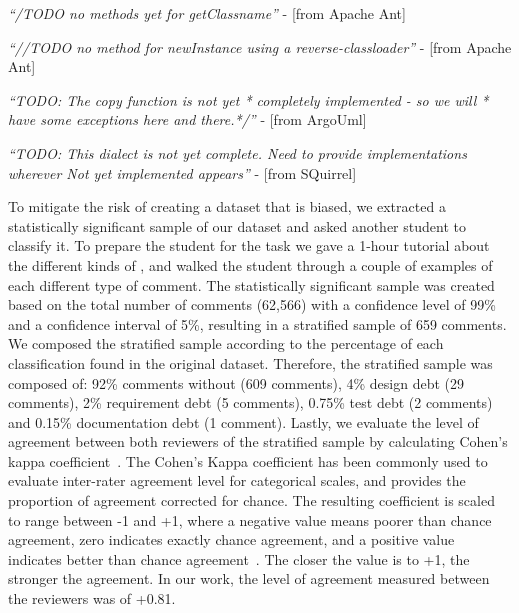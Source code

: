 \vspace{1mm}
    \begin{displayquote}
        \textit{``/TODO no methods yet for getClassname''} - [from Apache Ant]
    \end{displayquote}
    \vspace{1mm}
    \begin{displayquote}
        \textit{``//TODO no method for newInstance using a reverse-classloader''} - [from Apache Ant]
    \end{displayquote}
    \vspace{1mm}
    \begin{displayquote}
        \textit{``TODO: The copy function is not yet * completely implemented - so we will  * have some exceptions here and there.*/''} - [from ArgoUml]  
    \end{displayquote}
    \vspace{1mm}
    \begin{displayquote}
        \textit{``TODO: This dialect is not yet complete. Need to provide implementations wherever \textit{Not yet implemented} appears''} - [from SQuirrel]  
    \end{displayquote}
    \vspace{1mm}
\vspace{1mm}  

To mitigate the risk of creating a dataset that is biased, we extracted a statistically significant sample of our dataset and asked another student to classify it. To prepare the student for the task we gave a 1-hour tutorial about the different kinds of \SATD, and walked the student through a couple of examples of each different type of \SATD comment. The statistically significant sample was created based on the total number of comments (62,566) with a confidence level of 99\% and a confidence interval of 5\%, resulting in a stratified sample of 659 comments. We composed the stratified sample according to the percentage of each classification found in the original dataset. Therefore, the stratified sample was composed of: 92\% comments without \SATD  (609 comments), 4\% design debt (29 comments), 2\% requirement debt (5 comments), 0.75\% test debt  (2 comments) and 0.15\% documentation debt (1 comment). Lastly, we evaluate the level of agreement between both reviewers of the stratified sample by calculating Cohen's kappa coefficient~\cite{cohen1960coefficient}. The Cohen's Kappa coefficient has been commonly used to evaluate inter-rater agreement level for categorical scales, and provides the proportion of agreement corrected for chance. The resulting coefficient is scaled to range between -1 and +1, where a negative value means poorer than chance agreement, zero indicates exactly chance agreement, and a positive value indicates better than chance agreement~\cite{fleiss1973equivalence}. The closer the value is to +1, the stronger the agreement. In our work, the level of agreement measured between the reviewers was of +0.81.

